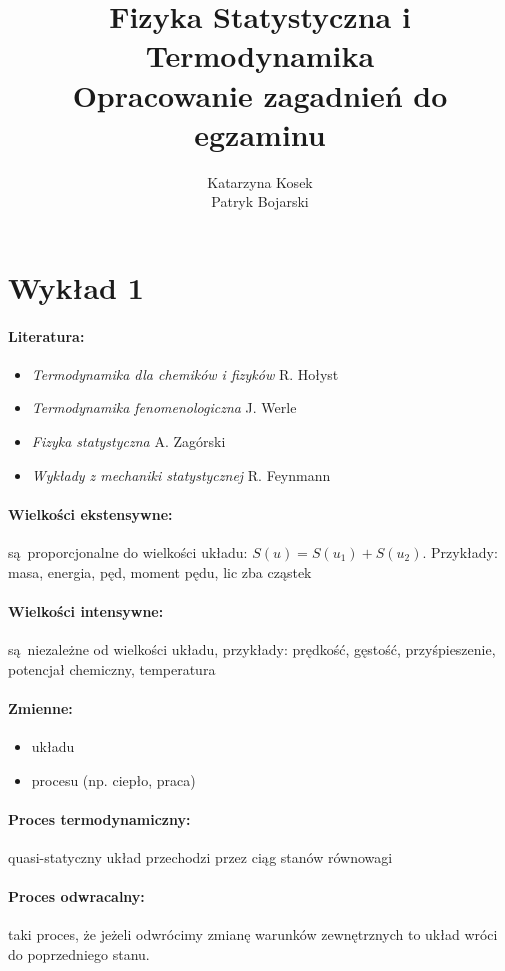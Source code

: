 \documentclass{article}
\title{Fizyka Statystyczna i Termodynamika \\ Opracowanie zagadnień do egzaminu}
\author{Katarzyna Kosek \\ Patryk Bojarski}
\begin{document}
	\maketitle
	\newpage
	\section{Wykład 1}
		\paragraph{Literatura:}
			\begin{itemize}
				\item \textit{Termodynamika dla chemików i fizyków} R. Hołyst
				\item \textit{Termodynamika fenomenologiczna} J. Werle
				\item \textit{Fizyka statystyczna} A. Zagórski
				\item \textit{Wykłady z mechaniki statystycznej} R. Feynmann
			\end{itemize}
		\paragraph{Wielkości ekstensywne:} są proporcjonalne do wielkości układu: $S(u) = S(u_1) + S(u_2)$. Przykłady: masa, energia, pęd, moment pędu, lic zba cząstek
		\paragraph{Wielkości intensywne:} są niezależne od wielkości układu, przykłady: prędkość, gęstość, przyśpieszenie, potencjał chemiczny, temperatura
		\paragraph{Zmienne: }
			\begin{itemize}
				\item układu
				\item procesu (np. ciepło, praca)
			\end{itemize}
		\paragraph{Proces termodynamiczny:} quasi-statyczny układ przechodzi przez ciąg stanów równowagi
		\paragraph{Proces odwracalny:} taki proces, że jeżeli odwrócimy zmianę warunków zewnętrznych to układ wróci do poprzedniego stanu.
\end{document}

